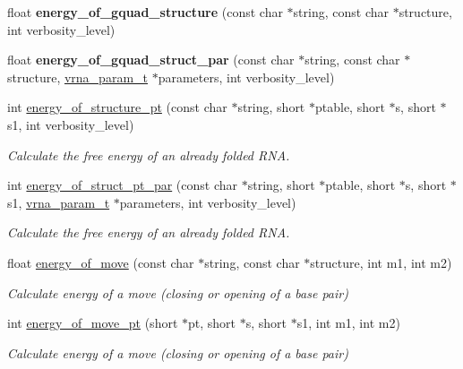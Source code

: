 \begin{DoxyCompactItemize}
\mbox{\label{group__eval_ga30687ad32835b9894875940958e3eb9a}} 
float {\bfseries energy\+\_\+of\+\_\+gquad\+\_\+structure} (const char $\ast$string, const char $\ast$structure, int verbosity\+\_\+level)
\item 
\mbox{\label{group__eval_ga7d8e18eab7bdc45744b063c81a25ca78}} 
float {\bfseries energy\+\_\+of\+\_\+gquad\+\_\+struct\+\_\+par} (const char $\ast$string, const char $\ast$structure, \hyperlink{group__energy__parameters_ga8a69ca7d787e4fd6079914f5343a1f35}{vrna\+\_\+param\+\_\+t} $\ast$parameters, int verbosity\+\_\+level)
\item 
int \hyperlink{group__eval_ga8831445966b761417e713360791299d8}{energy\+\_\+of\+\_\+structure\+\_\+pt} (const char $\ast$string, short $\ast$ptable, short $\ast$s, short $\ast$s1, int verbosity\+\_\+level)
\begin{DoxyCompactList}\small\item\em Calculate the free energy of an already folded R\+NA. \end{DoxyCompactList}\item 
int \hyperlink{group__eval_ga49acb3d5627dc6823a7ce12d116d4c69}{energy\+\_\+of\+\_\+struct\+\_\+pt\+\_\+par} (const char $\ast$string, short $\ast$ptable, short $\ast$s, short $\ast$s1, \hyperlink{group__energy__parameters_ga8a69ca7d787e4fd6079914f5343a1f35}{vrna\+\_\+param\+\_\+t} $\ast$parameters, int verbosity\+\_\+level)
\begin{DoxyCompactList}\small\item\em Calculate the free energy of an already folded R\+NA. \end{DoxyCompactList}\item 
float \hyperlink{group__eval_ga539ecaed89730f7644c202f304d7529b}{energy\+\_\+of\+\_\+move} (const char $\ast$string, const char $\ast$structure, int m1, int m2)
\begin{DoxyCompactList}\small\item\em Calculate energy of a move (closing or opening of a base pair) \end{DoxyCompactList}\item 
int \hyperlink{group__eval_ga49e0ee561be69faf0568213546f6a53f}{energy\+\_\+of\+\_\+move\+\_\+pt} (short $\ast$pt, short $\ast$s, short $\ast$s1, int m1, int m2)
\begin{DoxyCompactList}\small\item\em Calculate energy of a move (closing or opening of a base pair) \end{DoxyCompactList}\item 

\end{DoxyCompactItemize}
